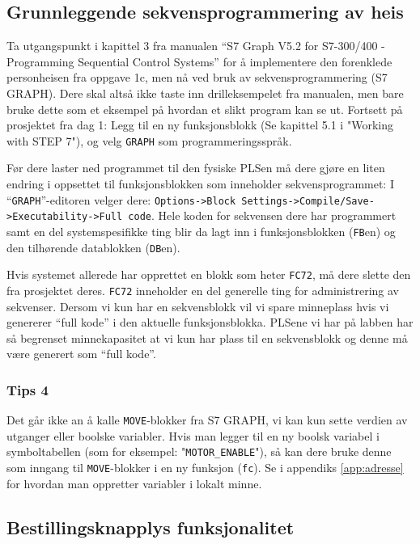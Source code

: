 \subsection{Grunnleggende sekvensprogrammering av heis}

Ta utgangspunkt i kapittel 3 fra manualen “S7 Graph V5.2 for S7-300/400 - Programming
Sequential Control Systems” for å implementere den forenklede personheisen fra oppgave 1c, men nå ved bruk av sekvensprogrammering (S7 GRAPH). Dere skal altså ikke taste inn drilleksempelet
fra manualen, men bare bruke dette som et eksempel på hvordan et slikt program
kan se ut. Fortsett på prosjektet fra dag 1: Legg til en ny funksjonsblokk (Se kapittel 5.1 i
"Working with STEP 7"), og velg \verb|GRAPH| som programmeringsspråk.


Før dere laster ned programmet til den fysiske PLSen må dere gjøre en liten endring i oppsettet
til funksjonsblokken som inneholder sekvensprogrammet: I “\verb|GRAPH|”-editoren velger dere:
\texttt{Options->Block Settings->Compile/Save->Executability->}\newline\verb|Full code|. Hele koden for
sekvensen dere har programmert samt en del systemspesifikke ting blir da lagt inn i
funksjonsblokken (\verb|FB|en) og den tilhørende datablokken (\verb|DB|en). 

Hvis systemet allerede har
opprettet en blokk som heter \verb|FC72|, må dere slette den fra prosjektet deres. \verb|FC72| inneholder en
del generelle ting for administrering av sekvenser. Dersom vi kun har en sekvensblokk vil vi
spare minneplass hvis vi genererer “full kode” i den aktuelle funksjonsblokka. PLSene vi har
på labben har så begrenset minnekapasitet at vi kun har plass til en sekvensblokk og denne må
være generert som “full kode”.

\subsubsection*{Tips 4}

Det går ikke an å kalle \verb|MOVE|-blokker fra S7 GRAPH, vi kan kun sette verdien av utganger
eller boolske variabler. Hvis man legger til en ny boolsk variabel i symboltabellen (som for eksempel: "\verb|MOTOR_ENABLE|"), så kan dere bruke denne som inngang til \verb|MOVE|-blokker i en ny
funksjon (\verb|fc|). Se i appendiks \ref{app:adresse} for hvordan man oppretter variabler i lokalt minne.

\subsection{Bestillingsknapplys funksjonalitet}

